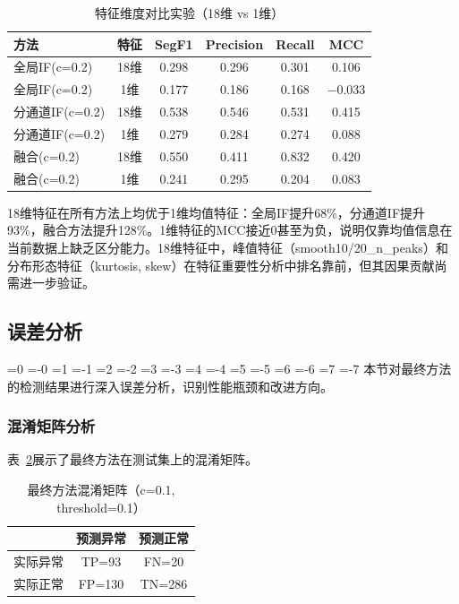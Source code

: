 \documentclass[12pt, a4paper]{article}
\newcommand{\zihao}[1]{%
    \ifnum#1=0 {\fontsize{42pt}{50pt}\selectfont}%
    \else\ifnum#1=-0 {\fontsize{36pt}{44pt}\selectfont}%
    \else\ifnum#1=1 {\fontsize{26pt}{32pt}\selectfont}%
    \else\ifnum#1=-1 {\fontsize{24pt}{28pt}\selectfont}%
    \else\ifnum#1=2 {\fontsize{22pt}{26pt}\selectfont}%
    \else\ifnum#1=-2 {\fontsize{18pt}{22pt}\selectfont}%
    \else\ifnum#1=3 {\fontsize{16pt}{20pt}\selectfont}%
    \else\ifnum#1=-3 {\fontsize{15pt}{18pt}\selectfont}%
    \else\ifnum#1=4 {\fontsize{14pt}{17pt}\selectfont}%
    \else\ifnum#1=-4 {\fontsize{12pt}{15pt}\selectfont}%
    \else\ifnum#1=5 {\fontsize{10.5pt}{13pt}\selectfont}%
    \else\ifnum#1=-5 {\fontsize{9pt}{11pt}\selectfont}%
    \else\ifnum#1=6 {\fontsize{7.5pt}{9pt}\selectfont}%
    \else\ifnum#1=-6 {\fontsize{6.5pt}{8pt}\selectfont}%
    \else\ifnum#1=7 {\fontsize{5.5pt}{7pt}\selectfont}%
    \else\ifnum#1=-7 {\fontsize{5pt}{6pt}\selectfont}%
    \fi\fi\fi\fi\fi\fi\fi\fi\fi\fi\fi\fi\fi\fi\fi\fi
}
\newcommand{\songti}{\CJKfontspec{SimSun}}
\begin{document}
\begin{table}[H]
\centering
\caption{特征维度对比实验（18维 vs 1维）}
\label{tab:feature_dim}
\begin{tabular}{lccccc}
\toprule
方法 & 特征 & SegF1 & Precision & Recall & MCC \\
\midrule
全局IF(c=0.2) & 18维 & 0.298 & 0.296 & 0.301 & 0.106 \\
全局IF(c=0.2) & 1维 & 0.177 & 0.186 & 0.168 & $-$0.033 \\
分通道IF(c=0.2) & 18维 & 0.538 & 0.546 & 0.531 & 0.415 \\
分通道IF(c=0.2) & 1维 & 0.279 & 0.284 & 0.274 & 0.088 \\
融合(c=0.2) & 18维 & 0.550 & 0.411 & 0.832 & 0.420 \\
融合(c=0.2) & 1维 & 0.241 & 0.295 & 0.204 & 0.083 \\
\bottomrule
\end{tabular}
\end{table}

18维特征在所有方法上均优于1维均值特征：全局IF提升68\%，分通道IF提升93\%，融合方法提升128\%。1维特征的MCC接近0甚至为负，说明仅靠均值信息在当前数据上缺乏区分能力。18维特征中，峰值特征（smooth10/20\_n\_peaks）和分布形态特征（kurtosis, skew）在特征重要性分析中排名靠前，但其因果贡献尚需进一步验证。

\subsection{误差分析}

\zihao{5}\songti
本节对最终方法的检测结果进行深入误差分析，识别性能瓶颈和改进方向。

\subsubsection{混淆矩阵分析}

表~\ref{tab:confusion}展示了最终方法在测试集上的混淆矩阵。

\begin{table}[H]
\centering
\caption{最终方法混淆矩阵（c=0.1, threshold=0.1）}
\label{tab:confusion}
\begin{tabular}{lcc}
\toprule
& 预测异常 & 预测正常 \\
\midrule
实际异常 & TP=93 & FN=20 \\
实际正常 & FP=130 & TN=286 \\
\bottomrule
\end{tabular}
\end{table}
\end{document}
